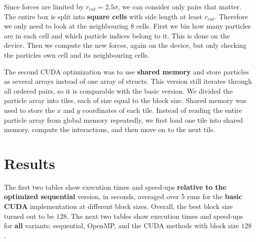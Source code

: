 \documentclass[11pt]{article}
\begin{document}
Since forces are limited by $r_{cut} = 2.5\sigma$, we can consider only pairs that matter. The entire box is split into \textbf{square cells} with side length at least $r_{cut}$. Therefore we only need to look at the neighbouring $8$ cells. First we bin how many particles are in each cell and which particle indices belong to it. This is done on the device. Then we compute the new forces, again on the device, but only checking the particles own cell and its neighbouring cells.

The second CUDA optimization was to use \textbf{shared memory} and store particles as several arrays instead of one array of structs. This version still iterates through all ordered pairs, so it is comparable with the basic version. We divided the particle array into tiles, each of size equal to the block size. Shared memory was used to store the $x$ and $y$ coordinates of each tile. Instead of reading the entire particle array from global memory repeatedly, we first load one tile into shared memory, compute the interactions, and then move on to the next tile.

\section{Results}

The first two tables show execution times and speed-ups \textbf{relative to the optimized sequential} version, in seconds, averaged over 5 runs for the \textbf{basic CUDA} implementation at different block sizes. Overall, the best block size turned out to be $128$. The next two tables show execution times and speed-ups for \textbf{all} variants: sequential, OpenMP, and the CUDA methods with block size $128$.
\end{document}
